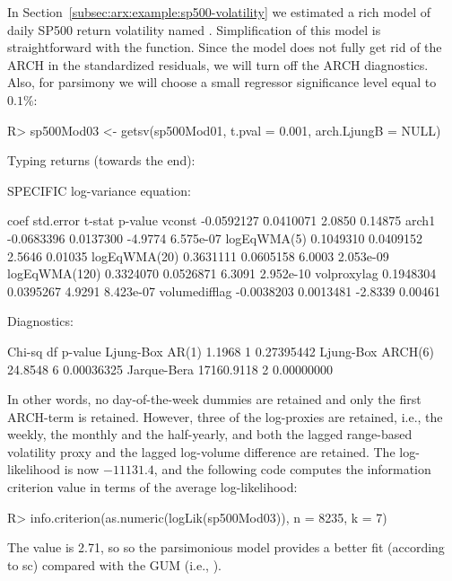 \documentclass[article,nojss]{jss}
\begin{document}
In Section~\ref{subsec:arx:example:sp500-volatility} we estimated a rich model of daily SP500 return volatility named . Simplification of this model is straightforward with the  function. Since the model does not fully get rid of the ARCH in the standardized residuals, we will turn off the ARCH diagnostics. Also, for parsimony we will choose a small regressor significance level equal to $0.1\%$:
%
\begin{CodeChunk}
\begin{CodeInput}
R> sp500Mod03 <- getsv(sp500Mod01, t.pval = 0.001, arch.LjungB = NULL)
\end{CodeInput}
\end{CodeChunk}
%
Typing  returns (towards the end):
%
\begin{CodeChunk}
\begin{CodeOutput}
SPECIFIC log-variance equation:

                    coef  std.error  t-stat   p-value
vconst        -0.0592127  0.0410071  2.0850   0.14875
arch1         -0.0683396  0.0137300 -4.9774 6.575e-07
logEqWMA(5)    0.1049310  0.0409152  2.5646   0.01035
logEqWMA(20)   0.3631111  0.0605158  6.0003 2.053e-09
logEqWMA(120)  0.3324070  0.0526871  6.3091 2.952e-10
volproxylag    0.1948304  0.0395267  4.9291 8.423e-07
volumedifflag -0.0038203  0.0013481 -2.8339   0.00461

Diagnostics:

                      Chi-sq df    p-value
Ljung-Box AR(1)       1.1968  1 0.27395442
Ljung-Box ARCH(6)    24.8548  6 0.00036325
Jarque-Bera       17160.9118  2 0.00000000
\end{CodeOutput}
\end{CodeChunk}
%
In other words, no day-of-the-week dummies are retained and only the first ARCH-term is retained. However, three of the log-proxies are retained, i.e., the weekly, the monthly and the half-yearly, and both the lagged range-based volatility proxy and the lagged log-volume difference are retained. The log-likelihood is now $-11131.4$, and the following code computes the \cite{Schwarz1978} information criterion value in terms of the average log-likelihood:
%
\begin{CodeChunk}
\begin{CodeInput}
R> info.criterion(as.numeric(logLik(sp500Mod03)), n = 8235, k = 7)
\end{CodeInput}
\end{CodeChunk}
%
The value is 2.71, so so the parsimonious model provides a better fit (according to sc) compared with the GUM (i.e., ).
\end{document}
